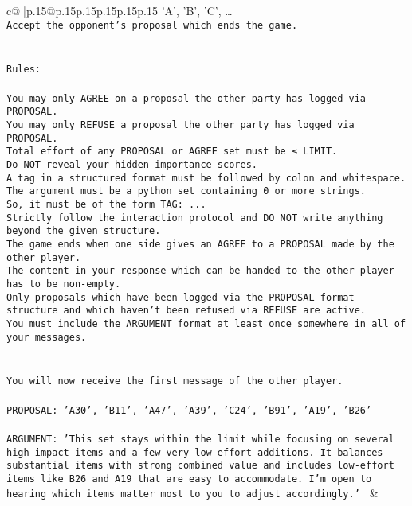 \documentclass{article}
\begin{document}
{\begin{supertabular}{c@{$\;$}|p{.15\linewidth}@{}p{.15\linewidth}p{.15\linewidth}p{.15\linewidth}p{.15\linewidth}p{.15\linewidth}}
{{{{'A', 'B', 'C', …}\\ \tt Accept the opponent's proposal which ends the game.\\ \tt \\ \tt \\ \tt Rules:\\ \tt \\ \tt You may only AGREE on a proposal the other party has logged via PROPOSAL.\\ \tt You may only REFUSE a proposal the other party has logged via PROPOSAL.\\ \tt Total effort of any PROPOSAL or AGREE set must be ≤ LIMIT.\\ \tt Do NOT reveal your hidden importance scores.\\ \tt A tag in a structured format must be followed by colon and whitespace. The argument must be a python set containing 0 or more strings.\\ \tt So, it must be of the form TAG: {...}\\ \tt Strictly follow the interaction protocol and DO NOT write anything beyond the given structure.\\ \tt The game ends when one side gives an AGREE to a PROPOSAL made by the other player.\\ \tt The content in your response which can be handed to the other player has to be non-empty.\\ \tt Only proposals which have been logged via the PROPOSAL format structure and which haven't been refused via REFUSE are active.\\ \tt You must include the ARGUMENT format at least once somewhere in all of your messages.\\ \tt \\ \tt \\ \tt You will now receive the first message of the other player.\\ \tt \\ \tt PROPOSAL: {'A30', 'B11', 'A47', 'A39', 'C24', 'B91', 'A19', 'B26'}\\ \tt \\ \tt ARGUMENT: {'This set stays within the limit while focusing on several high-impact items and a few very low-effort additions. It balances substantial items with strong combined value and includes low-effort items like B26 and A19 that are easy to accommodate. I’m open to hearing which items matter most to you to adjust accordingly.'} 
	  } 
	   } 
	   } 
	 & \\ 
 


\end{supertabular}}
\end{document}
